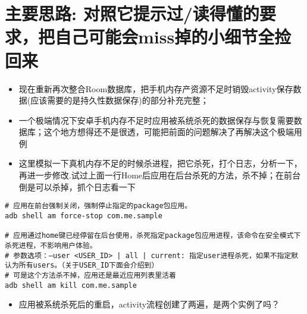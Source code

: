 \documentclass[9pt, b5paper]{article}
\begin{document}
\section{主要思路: \textbf{对照它提示过/读得懂的要求，把自己可能会miss掉的小细节全捡回来}}
\label{sec-2}
\begin{itemize}
\item 现在重新再次整合Room数据库，把手机内存产资源不足时销毁activity保存数据(应该需要的是持久性数据保存)的部分补充完整；
\item 一个极端情况下安卓手机内存不足时应用被系统杀死的数据保存与恢复需要数据库；这个地方想得还不是很透，可能把前面的问题解决了再解决这个极端用例
\item 这里模拟一下真机内存不足的时候杀进程，把它杀死，打个日志，分析一下，再进一步修改.试过上面一行Home后应用在后台杀死的方法，杀不掉；在前台倒是可以杀掉，抓个日志看一下
\end{itemize}
\begin{verbatim}
# 应用在前台强制关闭，强制停止指定的package包应用。
adb shell am force-stop com.me.sample 

# 应用通过home键已经停留在后台使用，杀死指定package包应用进程，该命令在安全模式下杀死进程，不影响用户体验。
# 参数选项：–user <USER_ID> | all | current: 指定user进程杀死，如果不指定默认为所有users。（关于USER_ID下面会介绍到）
# 可是这个方法杀不掉，应用还是最近应用列表里活着
adb shell am kill com.me.sample
\end{verbatim}
\begin{itemize}
\item 应用被系统杀死后的重启，activity流程创建了两遍，是两个实例了吗？
\end{itemize}
\end{document}
